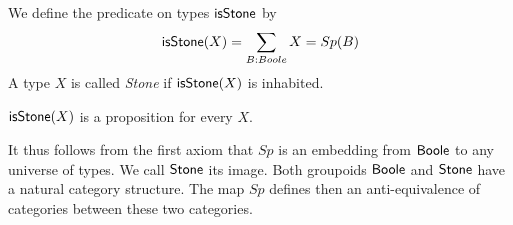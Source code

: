 \begin{definition}
  We define the predicate on types $\mathsf{isStone}$ by 
  \begin{equation}
    \mathsf{isStone}(X) = \sum\limits_{B : Boole} X = Sp(B)
  \end{equation} 
  A type $X$ is called \textit{Stone} if $\mathsf{isStone}(X)$ is inhabited.
\end{definition}

\begin{lemma}
  $\mathsf{isStone}(X)$ is a proposition for every $X$. 
\end{lemma} 



  

%

It thus follows from the first axiom that $Sp$ is an embedding from $\mathsf{Boole}$ to any universe of types. We call
$\mathsf{Stone}$ its image. Both groupoids $\mathsf{Boole}$ and $\mathsf{Stone}$ have a natural category structure.
The map $Sp$ defines then an anti-equivalence of categories between these two categories.

